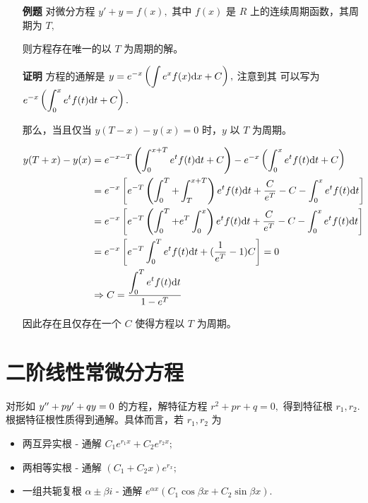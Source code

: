 \begin{itemize}
    \item[\textbf{例题} ] 对微分方程 $ y' + y = f(x), $ 其中 $ f(x) $ 是 $ R $ 上的连续周期函数，其周期为 $ T, $ 
    
    则方程存在唯一的以 $ T $ 为周期的解。
    \item[\textbf{证明}] 
    方程的通解是 $ \displaystyle y = e^{-x}\left(\int e^xf(x)\mathrm{d}x + C\right), $ 注意到其
    可以写为 $ \displaystyle e^{-x}\left(\int_0^x e^tf(t)\mathrm{d}t + C\right). $ 
    
    那么，当且仅当 $ y(T-x) - y(x) = 0 $ 
    时，$ y $ 以 $ T $ 为周期。
    
    \begin{equation*}
        \begin{aligned}
            y(T+x) - y(x) &= e^{-x-T}\left(\int_0^{x+T} e^tf(t)\mathrm{d}t + C\right)
            -e^{-x}\left(\int_0^{x} e^tf(t)\mathrm{d}t + C\right)
            \\&= e^{-x}\left[e^{-T}\left(\int_0^{T} + \int_{T}^{x+T}\right) e^tf(t)\mathrm{d}t + 
            \dfrac{C}{e^T} - C - \int_0^x e^tf(t)\mathrm{d}t \right]
            \\&= e^{-x}\left[e^{-T}\left(\int_0^{T} + e^T\int_{0}^{x}\right) e^tf(t)\mathrm{d}t + 
            \dfrac{C}{e^T} - C - \int_0^x e^tf(t)\mathrm{d}t \right]
            \\&= e^{-x}\left[e^{-T}\int_0^{T} e^tf(t)\mathrm{d}t + 
            (\dfrac{1}{e^T}-1)C\right] = 0
            \\&\Rightarrow C = \dfrac{\displaystyle \int_0^T e^tf(t)\mathrm{d}t}{1-e^T}
        \end{aligned}
    \end{equation*}
    
    因此存在且仅存在一个 $ C $ 使得方程以 $ T $ 为周期。
\end{itemize}




\section{二阶线性常微分方程}


对形如 $ y^{\prime\prime} + py' + qy = 0 $ 的方程，解特征方程
$ r^2 + pr + q = 0, $ 得到特征根 $ r_1,r_2. $ 
根据特征根性质得到通解。具体而言，若 $ r_1,r_2 $ 为
\begin{itemize}
    \item 两互异实根 - 通解 $ C_1e^{r_1x} + C_2e^{r_2x}; $ 
    \item 两相等实根 - 通解 $ (C_1 + C_2x)e^{r_x}; $ 
    \item 一组共轭复根 $ \alpha\pm\beta i $ - 通解 $ e^{\alpha x}\left(C_1\cos \beta x + C_2\sin \beta x\right). $ 
\end{itemize}

